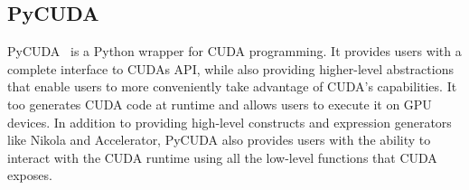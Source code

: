 \subsection{PyCUDA}

PyCUDA~\cite{klockner2009pycuda} is a Python wrapper for CUDA
programming. It provides users with a complete interface to CUDAs API,
while also providing higher-level abstractions that enable users to
more conveniently take advantage of CUDA's capabilities. It too
generates CUDA code at runtime and allows users to execute it on GPU
devices. In addition to providing high-level constructs and expression
generators like Nikola and Accelerator, PyCUDA also provides users
with the ability to interact with the CUDA runtime using all the
low-level functions that CUDA exposes.

